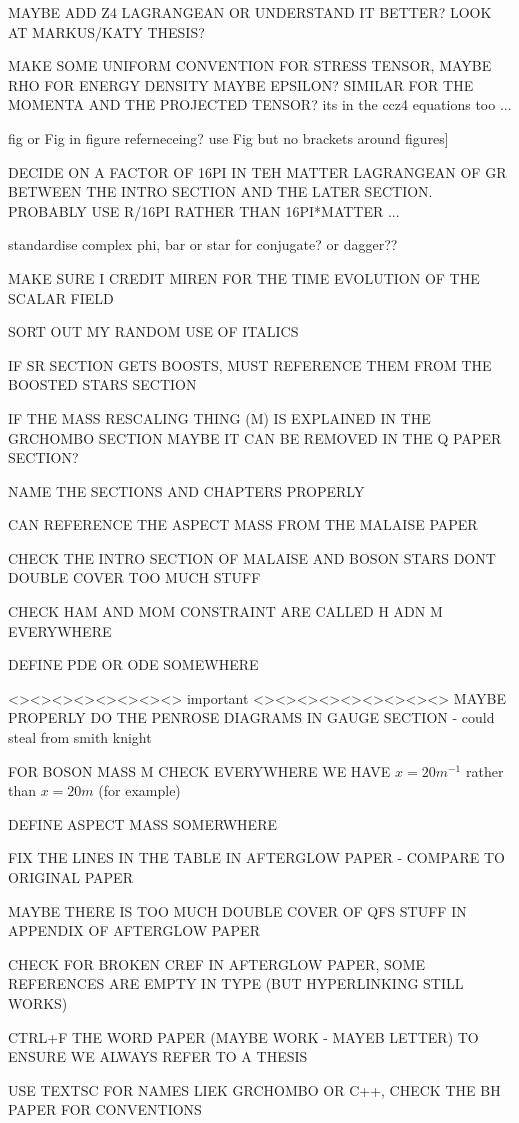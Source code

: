 \documentclass[11pt]{report}  %
\numberwithin{equation}{section}
\begin{document}
MAYBE ADD Z4 LAGRANGEAN OR UNDERSTAND IT BETTER? LOOK AT MARKUS/KATY THESIS?

MAKE SOME UNIFORM CONVENTION FOR STRESS TENSOR, MAYBE RHO FOR ENERGY DENSITY MAYBE EPSILON? SIMILAR FOR THE MOMENTA AND THE PROJECTED TENSOR? its in the ccz4 equations too ...

fig or Fig in figure referneceing? use Fig but no brackets around figures]

DECIDE ON A FACTOR OF 16PI IN TEH MATTER LAGRANGEAN OF GR BETWEEN THE INTRO SECTION AND THE LATER SECTION. PROBABLY USE R/16PI RATHER THAN 16PI*MATTER ... 

standardise complex phi, bar or star for conjugate? or dagger??

MAKE SURE I CREDIT MIREN FOR THE TIME EVOLUTION OF THE SCALAR FIELD

SORT OUT MY RANDOM USE OF ITALICS

IF SR SECTION GETS BOOSTS, MUST REFERENCE THEM FROM THE BOOSTED STARS SECTION

IF THE MASS RESCALING THING (M) IS EXPLAINED IN THE GRCHOMBO SECTION MAYBE IT CAN BE REMOVED IN THE Q PAPER SECTION?

NAME THE SECTIONS AND CHAPTERS PROPERLY

CAN REFERENCE THE ASPECT MASS FROM THE MALAISE PAPER

CHECK THE INTRO SECTION OF MALAISE AND BOSON STARS DONT DOUBLE COVER TOO MUCH STUFF

CHECK HAM AND MOM CONSTRAINT ARE CALLED H ADN M EVERYWHERE

DEFINE PDE OR ODE SOMEWHERE

<><><><><><><><> important <><><><><><><><><>
MAYBE PROPERLY DO THE PENROSE DIAGRAMS IN GAUGE SECTION - could steal from smith knight

FOR BOSON MASS M CHECK EVERYWHERE WE HAVE   $x = 20 m^{-1}$ rather than $x = 20 m$ (for example) 

DEFINE ASPECT MASS SOMERWHERE 

FIX THE LINES IN THE TABLE IN AFTERGLOW PAPER - COMPARE TO ORIGINAL PAPER

MAYBE THERE IS TOO MUCH DOUBLE COVER OF QFS STUFF IN APPENDIX OF AFTERGLOW PAPER

CHECK FOR BROKEN CREF IN AFTERGLOW PAPER, SOME REFERENCES ARE EMPTY IN TYPE (BUT HYPERLINKING STILL WORKS)

CTRL+F THE WORD PAPER (MAYBE WORK - MAYEB LETTER) TO ENSURE WE ALWAYS REFER TO A THESIS

USE TEXTSC FOR NAMES LIEK GRCHOMBO OR C++, CHECK THE BH PAPER FOR CONVENTIONS
\end{document}
